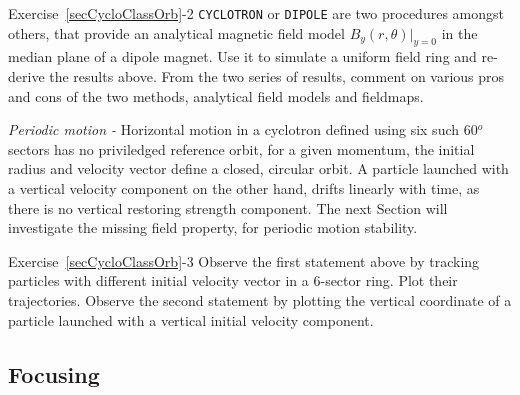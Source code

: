 \smallskip
\noindent {\small $\bullet$} Exercise~\ref{secCycloClassOrb}-2 
 \verb|CYCLOTRON| or \verb|DIPOLE| are two procedures amongst others, that provide an analytical 
 magnetic field model ${B_y(r,\theta)|_{y=0}}$ in the median plane of a dipole magnet. 
Use it to simulate a uniform field ring and re-derive the results above. 
From the two series of results, comment on various pros and cons of the two methods, analytical field models and 
fieldmaps.

\medskip

\noindent \textsl{Periodic motion -} 
Horizontal motion in a  cyclotron defined using six such 60$^o$ sectors has no priviledged reference orbit, 
for a given momentum, the initial radius and velocity vector define a closed, circular orbit.  
A particle launched with a vertical velocity component on the other hand, drifts linearly with time, as there is no 
vertical restoring strength component. The next Section will investigate the missing field property, 
for  periodic motion stability. 


\smallskip
\noindent {\small $\bullet$} Exercise~\ref{secCycloClassOrb}-3 
Observe the first statement above by tracking  particles with different initial velocity vector in a 6-sector ring. 
Plot their trajectories. 
Observe the second statement by plotting the vertical coordinate  of a particle launched with a 
vertical initial velocity component. 



\subsection{Focusing  \label{secCycloFocus}}

